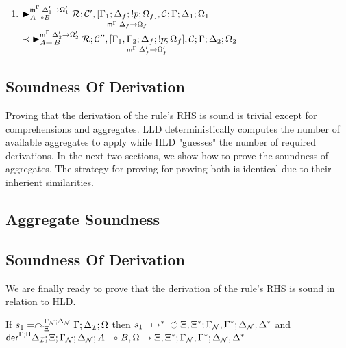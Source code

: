 \begin{enumerate}[leftmargin=*]
   \item $\matstate{A \lolli B}{\rulestk}{\lstack{C'},
      \pframe{\Gamma_1}{\Delta_f}{\bang p}{\Omega_f}{\Delta_f}{\Omega_f},
   \lstack{C}}{\Gamma}{\Delta_1}{\Omega_1}{\Delta'_1 \rightarrow \Omega'_1}$\\
   \hspace*{1cm} $\prec \matstate{A \lolli B}{\rulestk}{\lstack{C''},
      \pframe{\Gamma_1, \Gamma_2}{\Delta_f}{\bang p}{\Omega_f}{\Delta'_f}{\Omega'_f},
      \lstack{C}}{\Gamma}{\Delta_2}{\Omega_2}{\Delta'_2 \rightarrow \Omega'_2}$

\end{enumerate}

\subsection{Soundness Of Derivation}

Proving that the derivation of the rule's RHS is sound is trivial except
for comprehensions and aggregates. LLD deterministically computes the number of
available aggregates to apply while HLD "guesses" the number of required
derivations.  In the next two sections, we show how to prove the soundness of
aggregates. The strategy for proving for proving both is identical due to their
inherient similarities.

\subsection{Aggregate Soundness}



\subsection{Soundness Of Derivation}

We are finally ready to prove that the derivation of the rule's RHS is sound in
relation to HLD.

\begin{lemma}\label{thm:head_derivation_soundness}
If $s_1 = \derstatex{\Gamma}{\deltan}{\Xi}{\gammanew}{\deltanew}{\Omega}$
then $\transs{s_1}{\finalstate{\Xi, \Xi^{*}}{\gammanew,
      \Gamma^{*}}{\deltanew, \Delta^{*}}}$ and\\
$\dz{\Gamma}{\Pi}{\deltan}{\Xi}{\gammanew}{\deltanew}{A \lolli B,
   \Omega}{\Xi, \Xi^{*}; \gammanew, \Gamma^{*}; \deltanew, \Delta^{*}}$
\end{lemma}

